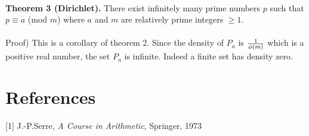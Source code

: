 \documentclass[11pt]{article}
\begin{document}
\vspace{9mm}
\\
\textbf{Theorem 3 (Dirichlet).}
There exist infinitely many prime numbers $p$ such that $p\equiv a$ (mod $m$) where $a$ and $m$ are relatively prime integers $\geq1$.
\\
\\
Proof) This is a corollary of theorem 2. Since the density of $P_a$ is ${1\over \phi(m)}$ which is a positive real number, the set $P_a$ is infinite. Indeed a finite set has density zero.
\vspace{10mm}

\section*{References}
[1] J.-P.Serre, \textit{A Course in Arithmetic}, Springer, 1973
\end{document}
